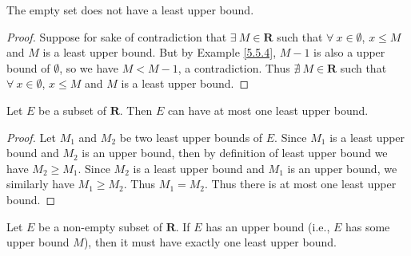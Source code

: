 \begin{additional corollary}\label{ac 5.5.2}
The empty set does not have a least upper bound.
\end{additional corollary}

\begin{proof}
Suppose for sake of contradiction that \(\exists\ M \in \mathbf{R}\) such that \(\forall\ x \in \emptyset\), \(x \leq M\) and \(M\) is a least upper bound.
But by Example \ref{5.5.4}, \(M - 1\) is also a upper bound of \(\emptyset\), so we have \(M < M - 1\), a contradiction.
Thus \(\nexists\ M \in \mathbf{R}\) such that \(\forall\ x \in \emptyset\), \(x \leq M\) and \(M\) is a least upper bound.
\end{proof}

\setcounter{theorem}{7}
\begin{proposition}\label{5.5.8}
Let \(E\) be a subset of \(\mathbf{R}\).
Then \(E\) can have at most one least upper bound.
\end{proposition}

\begin{proof}
Let \(M_1\) and \(M_2\) be two least upper bounds of \(E\).
Since \(M_1\) is a least upper bound and \(M_2\) is an upper bound, then by definition of least upper bound we have \(M_2 \geq M_1\).
Since \(M_2\) is a least upper bound and \(M_1\) is an upper bound, we similarly have \(M_1 \geq M_2\).
Thus \(M_1 = M_2\).
Thus there is at most one least upper bound.
\end{proof}

\begin{theorem}\label{5.5.9}
Let \(E\) be a non-empty subset of \(\mathbf{R}\).
If \(E\) has an upper bound (i.e., \(E\) has some upper bound \(M\)), then it must have exactly one least upper bound.
\end{theorem}

